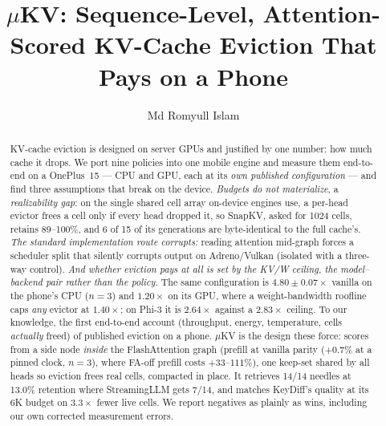 \documentclass[sigconf,10pt]{acmart}
\begin{document}
\title[Attention-Scored Eviction That Pays on a Phone]{$\mu$KV: Sequence-Level, Attention-Scored KV-Cache Eviction That Pays on a Phone}

\author{Md Romyull Islam}

\begin{abstract}
KV-cache eviction is designed on server GPUs and justified by one number: how much cache it drops. We port
nine policies into one mobile engine and measure them end-to-end on a OnePlus~15 --- CPU and GPU, each at its
\emph{own published configuration} --- and find three assumptions that break on the device.
\emph{Budgets do not materialize}, a \emph{realizability gap}: on the single shared cell array on-device engines use, a per-head evictor frees a cell only if every head dropped it, so SnapKV, asked for 1024 cells, retains 89--100\%, and 6 of 15 of its generations are byte-identical to the full cache's.
\emph{The standard implementation route corrupts:} reading attention mid-graph forces a scheduler split that silently corrupts output on Adreno/Vulkan (isolated with a three-way control).
\emph{And whether eviction pays at all is set by the \emph{KV/W ceiling}, the model--backend pair rather than the policy.} The same configuration is $\mathbf{4.80{\pm}0.07\times}$ vanilla on the phone's CPU ($n{=}3$) and $1.20\times$ on its GPU, where a weight-bandwidth roofline caps \emph{any} evictor at $1.40\times$; on Phi-3 it is $2.64\times$ against a $2.83\times$ ceiling. To our knowledge, the first end-to-end account (throughput, energy, temperature, cells \emph{actually} freed) of published eviction on a phone.
$\mu$KV is the design these force: scores from a side node \emph{inside} the FlashAttention graph
(prefill at vanilla parity ($+0.7\%$ at a pinned clock, $n{=}3$), where FA-off prefill costs $+33$--$111\%$), one keep-set shared by all heads so eviction frees
real cells, compacted in place. It retrieves 14/14 needles at 13.0\% retention where StreamingLLM gets 7/14,
and matches KeyDiff's quality at its 6K budget on $3.3\times$ fewer live cells. We report negatives as plainly as wins, including our own corrected measurement errors.
\end{abstract}


\maketitle
\end{document}
